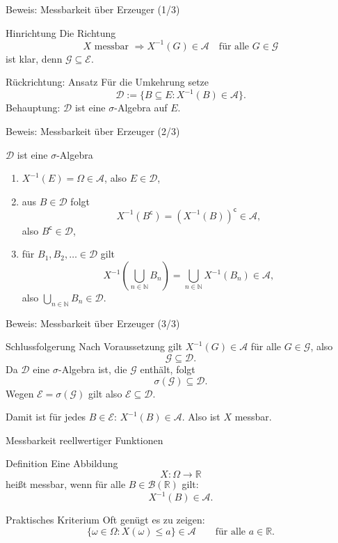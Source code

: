 \documentclass{beamer}
\begin{document}
\begin{frame}{Beweis: Messbarkeit über Erzeuger (1/3)}
\begin{block}{Hinrichtung}
Die Richtung
\[
X \text{ messbar } \Rightarrow X^{-1}(G)\in\mathcal A
\quad\text{für alle }G\in\mathcal G
\]
ist klar, denn \(\mathcal G\subseteq\mathcal E\).
\end{block}

\begin{block}{Rückrichtung: Ansatz}
Für die Umkehrung setze
\[
\mathcal D:=\{B\subseteq E : X^{-1}(B)\in\mathcal A\}.
\]
Behauptung: \(\mathcal D\) ist eine \(\sigma\)-Algebra auf \(E\).
\end{block}
\end{frame}

\begin{frame}{Beweis: Messbarkeit über Erzeuger (2/3)}
\begin{block}{\(\mathcal D\) ist eine \(\sigma\)-Algebra}
\begin{enumerate}
    \item \(X^{-1}(E)=\Omega\in\mathcal A\), also \(E\in\mathcal D\),
    \item aus \(B\in\mathcal D\) folgt
    \[
    X^{-1}(B^{\mathsf c})=(X^{-1}(B))^{\mathsf c}\in\mathcal A,
    \]
    also \(B^{\mathsf c}\in\mathcal D\),
    \item für \(B_1,B_2,\dots\in\mathcal D\) gilt
    \[
    X^{-1}\!\left(\bigcup_{n\in\mathbb N} B_n\right)
    =
    \bigcup_{n\in\mathbb N} X^{-1}(B_n)\in\mathcal A,
    \]
    also \(\bigcup_{n\in\mathbb N} B_n\in\mathcal D\).
\end{enumerate}
\end{block}
\end{frame}

\begin{frame}{Beweis: Messbarkeit über Erzeuger (3/3)}
\begin{block}{Schlussfolgerung}
Nach Voraussetzung gilt \(X^{-1}(G)\in\mathcal A\) für alle \(G\in\mathcal G\), also
\[
\mathcal G\subseteq\mathcal D.
\]
Da \(\mathcal D\) eine \(\sigma\)-Algebra ist, die \(\mathcal G\) enthält, folgt
\[
\sigma(\mathcal G)\subseteq\mathcal D.
\]
Wegen \(\mathcal E=\sigma(\mathcal G)\) gilt also \(\mathcal E\subseteq\mathcal D\).

Damit ist für jedes \(B\in\mathcal E\): \(X^{-1}(B)\in\mathcal A\).
Also ist \(X\) messbar.
\end{block}
\end{frame}

\begin{frame}{Messbarkeit reellwertiger Funktionen}
\begin{block}{Definition}
Eine Abbildung
\[
X\colon \Omega \to \mathbb R
\]
hei\ss{}t messbar, wenn für alle \(B\in\mathcal B(\mathbb R)\) gilt:
\[
X^{-1}(B)\in\mathcal A.
\]
\end{block}

\begin{block}{Praktisches Kriterium}
Oft genügt es zu zeigen:
\[
\{\omega\in\Omega : X(\omega)\le a\}\in\mathcal A
\qquad
\text{für alle } a\in\mathbb R.
\]
\end{block}
\end{frame}
\end{document}
